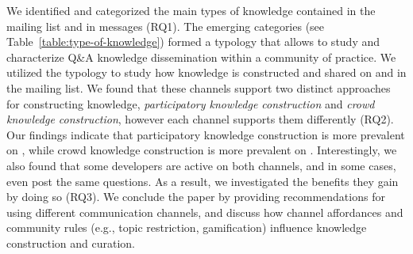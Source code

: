 We identified and categorized the main types of knowledge contained in the \RH mailing list and in \SO messages (RQ1). The emerging categories (see Table~\ref{table:type-of-knowledge}) formed a typology that allows to study and characterize Q\&A knowledge dissemination within a community of practice. We utilized the typology to study how knowledge is constructed and shared on \SO and in the \RH mailing list. We found that these channels support two distinct approaches for constructing knowledge, \textit{participatory knowledge construction} and \textit{crowd knowledge construction}, however each channel supports them differently (RQ2). Our findings indicate that participatory knowledge construction is more prevalent on \RH, while crowd knowledge construction is more prevalent on \SO. Interestingly, we also found that some developers are active on both channels, and in some cases, even post the same questions. As a result, we investigated the benefits they gain by doing so (RQ3). We conclude the paper by providing recommendations for using different communication channels, and discuss how channel affordances and community rules (e.g., topic restriction, gamification) influence knowledge construction and curation.



